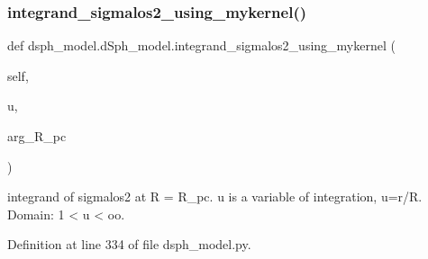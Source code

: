 \subsubsection{\texorpdfstring{integrand\+\_\+sigmalos2\+\_\+using\+\_\+mykernel()}{integrand\_sigmalos2\_using\_mykernel()}}
{\footnotesize\ttfamily def dsph\+\_\+model.\+d\+Sph\+\_\+model.\+integrand\+\_\+sigmalos2\+\_\+using\+\_\+mykernel (\begin{DoxyParamCaption}\item[{}]{self,  }\item[{}]{u,  }\item[{}]{arg\+\_\+\+R\+\_\+pc }\end{DoxyParamCaption})}

\begin{DoxyVerb}integrand of sigmalos2 at R = R_pc.
u is a variable of integration, u=r/R.
Domain: 1 < u < oo.
\end{DoxyVerb}
 

Definition at line 334 of file dsph\+\_\+model.\+py.


